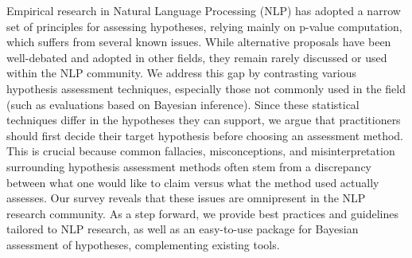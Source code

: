 Empirical research in Natural Language Processing (NLP) has adopted a narrow set of principles for assessing hypotheses, relying mainly on p-value computation, which suffers from several known issues. While alternative proposals have been well-debated and adopted in other fields, they remain rarely discussed or used within the NLP community. We address this gap by contrasting various hypothesis assessment techniques, especially those not commonly used in the field (such as evaluations based on Bayesian inference). Since these statistical techniques differ in the hypotheses they can support, we argue that practitioners should first decide their target hypothesis before choosing an assessment method. This is crucial because common fallacies, misconceptions, and misinterpretation surrounding hypothesis assessment methods often stem from a discrepancy between what one would like to claim versus what the method used actually assesses. Our survey reveals that these issues are omnipresent in the NLP research community. As a step forward, we provide best practices and guidelines tailored to NLP research, as well as an easy-to-use package for Bayesian assessment of hypotheses, complementing existing tools.
